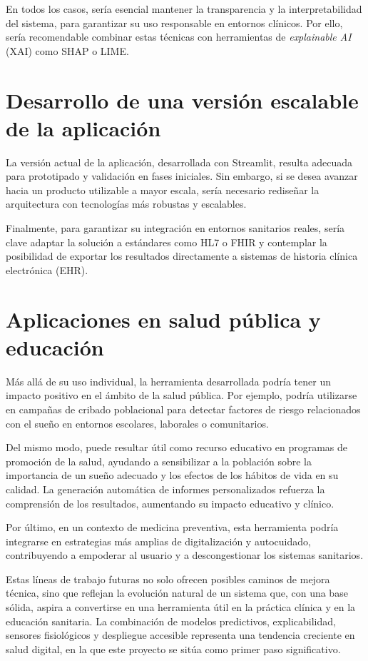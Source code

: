 En todos los casos, sería esencial mantener la transparencia y la interpretabilidad del sistema, para garantizar su uso responsable en entornos clínicos. Por ello, sería recomendable combinar estas técnicas con herramientas de \textit{explainable AI} (XAI) como SHAP o LIME.

 


\section{Desarrollo de una versión escalable de la aplicación}

La versión actual de la aplicación, desarrollada con Streamlit, resulta adecuada para prototipado y validación en fases iniciales. Sin embargo, si se desea avanzar hacia un producto utilizable a mayor escala, sería necesario rediseñar la arquitectura con tecnologías más robustas y escalables. 

Finalmente, para garantizar su integración en entornos sanitarios reales, sería clave adaptar la solución a estándares como HL7 o FHIR y contemplar la posibilidad de exportar los resultados directamente a sistemas de historia clínica electrónica (EHR). 

\section{Aplicaciones en salud pública y educación}
Más allá de su uso individual, la herramienta desarrollada podría tener un impacto positivo en el ámbito de la salud pública. Por ejemplo, podría utilizarse en campañas de cribado poblacional para detectar factores de riesgo relacionados con el sueño en entornos escolares, laborales o comunitarios.

Del mismo modo, puede resultar útil como recurso educativo en programas de promoción de la salud, ayudando a sensibilizar a la población sobre la importancia de un sueño adecuado y los efectos de los hábitos de vida en su calidad. La generación automática de informes personalizados refuerza la comprensión de los resultados, aumentando su impacto educativo y clínico.

Por último, en un contexto de medicina preventiva, esta herramienta podría integrarse en estrategias más amplias de digitalización y autocuidado, contribuyendo a empoderar al usuario y a descongestionar los sistemas sanitarios.


Estas líneas de trabajo futuras no solo ofrecen posibles caminos de mejora técnica, sino que reflejan la evolución natural de un sistema que, con una base sólida, aspira a convertirse en una herramienta útil en la práctica clínica y en la educación sanitaria. La combinación de modelos predictivos, explicabilidad, sensores fisiológicos y despliegue accesible representa una tendencia creciente en salud digital, en la que este proyecto se sitúa como primer paso significativo.
